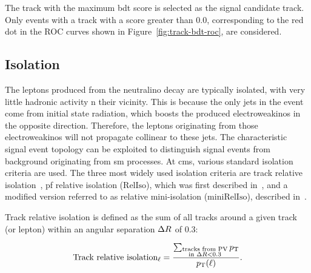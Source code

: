 The track with the maximum \gls{bdt} score is selected as the signal candidate track. Only events with a track with a score greater than 0.0, corresponding to the red dot in the ROC curves shown in Figure~\ref{fig:track-bdt-roc}, are considered.

\clearpage
\subsection{Isolation}
\label{sec:isolation}

The leptons produced from the neutralino decay \neuttdecay are typically isolated, with very little hadronic activity n their vicinity. This is because the only jets in the event come from initial state radiation, which boosts the produced electroweakinos in the opposite direction. Therefore, the leptons originating from those electroweakinos will not propagate collinear to these jets. The characteristic signal event topology can be exploited to distinguish signal events from background originating from \gls{sm} processes. At \gls{cms}, various standard isolation criteria are used. The three most widely used isolation criteria are track relative isolation~\cite{muon-pog-recommendations}, \gls{pf} relative isolation ($\mathrm{RelIso}$), which was first described in~\cite{Chatrchyan_2011}, and a modified version referred to as relative mini-isolation ($\mathrm{miniRelIso}$), described in~\cite{Rehermann_2011}.

Track relative isolation is defined as the \pt sum of all tracks around a given track (or lepton) within an angular separation $\Delta R$ of 0.3:

\begin{equation}
\text{Track relative isolation}_\ell = \frac{ \sum_{\substack{\text{tracks from PV}\\ \text{in } \Delta R<0.3}}p_{\mathrm{T}}}{ p_{\mathrm{T}}(\ell) }.
\end{equation}

